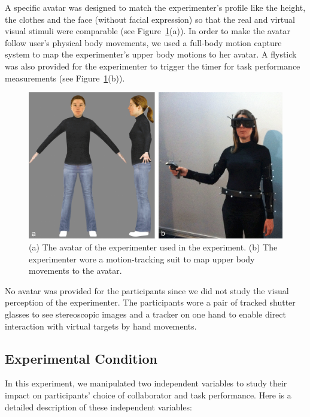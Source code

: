 A specific avatar was designed to match the experimenter's profile like the height, the clothes and the face (without facial expression) so that the real and virtual visual stimuli were comparable (see Figure~\ref{fig:2_avatar}(a)). In order to make the avatar follow user's physical body movements, we used a full-body motion capture system to map the experimenter's upper body motions to her avatar. A flystick was also provided for the experimenter to trigger the timer for task performance measurements (see Figure~\ref{fig:2_avatar}(b)).

\begin{figure}[ht]
  \centering
  \includegraphics[width=\textwidth]{figures/2_avatar_photo}
  \caption{\label{fig:2_avatar}(a) The avatar of the experimenter used in the experiment. (b) The experimenter wore a motion-tracking suit to map upper body movements to the avatar.}
\end{figure}

No avatar was provided for the participants since we did not study the visual perception of the experimenter. The participants wore a pair of tracked shutter glasses to see stereoscopic images and a tracker on one hand to enable direct interaction with virtual targets by hand movements.

\subsection{Experimental Condition}
In this experiment, we manipulated two independent variables to study their impact on participants' choice of collaborator and task performance. Here is a detailed description of these independent variables:


